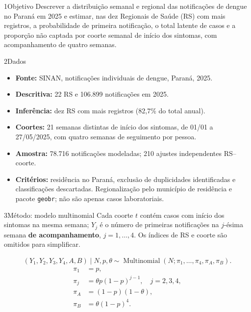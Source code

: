 \documentclass{rbras-poster}
\newcommand{\eqPosterPeq}{\fontsize{23bp}{29bp}\selectfont}
\begin{document}
\begin{colunaesquerda}
\vspace{-40pt}
\begin{secao}{1}{Objetivo}
Descrever a distribuição semanal e regional das notificações de dengue
no Paraná em 2025 e estimar, nas dez Regionais de Saúde (RS) com mais
registros, a probabilidade de primeira notificação, o total latente
de casos e a proporção não captada por coorte semanal de início dos
sintomas, com acompanhamento de quatro semanas.
\end{secao}

\begin{secao}{2}{Dados}
\vspace{-30pt}
\begin{itemize}
\item \textbf{Fonte:} SINAN, notificações individuais de dengue, Paraná, 2025.
\item \textbf{Descritiva:} 22 RS e 106.899 notificações em 2025.
\item \textbf{Inferência:} dez RS com mais registros (82,7\% do total anual).
\item \textbf{Coortes:} 21 semanas distintas de início dos sintomas, de 01/01 a 27/05/2025, com quatro semanas de seguimento por pessoa.
\item \textbf{Amostra:} 78.716 notificações modeladas; 210 ajustes independentes RS--coorte.
\item \textbf{Critérios:} residência no Paraná, exclusão de duplicidades identificadas e classificações descartadas. Regionalização pelo município de residência e pacote \texttt{geobr}; não são apenas casos laboratoriais.
\end{itemize}
\end{secao}

\begin{secao}{3}{Método: modelo multinomial}
Cada coorte $t$ contém casos com início dos sintomas na mesma semana;
$Y_j$ é o número de primeiras notificações na $j$-ésima semana
\textbf{de acompanhamento}, $j=1,\ldots,4$. Os índices de RS e coorte
são omitidos para simplificar.

\begin{caixametodo}
{\eqPosterPeq
\begin{equation*}
\begin{gathered}
(Y_1,Y_2,Y_3,Y_4,A,B)\mid N,p,\theta
\sim\operatorname{Multinomial}(N;\pi_1,\ldots,\pi_4,\pi_A,\pi_B).
\end{gathered}
\end{equation*}
\begin{equation*}
\begin{aligned}
\pi_1&=p,\\
\pi_j&=\theta p(1-p)^{j-1},\quad j=2,3,4,\\
\pi_A&=(1-p)(1-\theta),\\
\pi_B&=\theta(1-p)^4.
\end{aligned}
\end{equation*}}
\end{caixametodo}


\end{secao}
\end{colunaesquerda}
\end{document}
